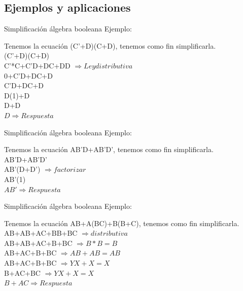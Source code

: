 \documentclass[aspectratio=169]{beamer}
\begin{document}
\subsection{Ejemplos y aplicaciones}

\begin{frame}{Simplificación álgebra booleana}
    Ejemplo:
    
    Tenemos la ecuación (C'+D)(C+D), tenemos como fin simplificarla.\\
    (C'+D)(C+D)\\
    C'*C+C'D+DC+DD $\Rightarrow Ley distributiva$\\
    0+C'D+DC+D\\
    C'D+DC+D\\
    D(1)+D\\
    D+D\\
    $D \Rightarrow Respuesta$
    
\end{frame}

\begin{frame}{Simplificación álgebra booleana}
    Ejemplo:
    
    Tenemos la ecuación AB'D+AB'D', tenemos como fin simplificarla.\\
    AB'D+AB'D'\\
    AB'(D+D')  $\Rightarrow factorizar$\\
    AB'(1)\\
    $AB' \Rightarrow Respuesta$
    
\end{frame}

\begin{frame}{Simplificación álgebra booleana}
    Ejemplo:
    
    Tenemos la ecuación AB+A(BC)+B(B+C), tenemos como fin simplificarla.\\
    AB+AB+AC+BB+BC $\Rightarrow distributiva$\\
    AB+AB+AC+B+BC  $\Rightarrow B*B=B$\\
    AB+AC+B+BC $\Rightarrow AB+AB=AB$\\
    \textcolor{ITMOblue}{AB}+AC+\textcolor{ITMOblue}{B}+BC $\Rightarrow YX+X=X$\\
    \textcolor{ITMOblue}{B}+AC+\textcolor{ITMOblue}{BC} $\Rightarrow YX+X=X$\\
    $B+AC \Rightarrow Respuesta$
    
\end{frame}
\end{document}
